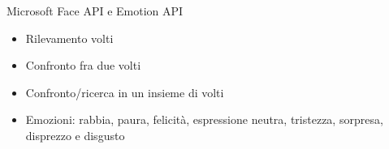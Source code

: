%
\begin{frame}[t]{Microsoft Face API e Emotion API}
\begin{itemize}
	\item Rilevamento volti
	\item Confronto fra due volti
	\item Confronto/ricerca in un insieme di volti
	\item Emozioni: rabbia, paura, felicità, espressione neutra, tristezza, sorpresa, disprezzo e disgusto
\end{itemize}
\end{frame}
%
